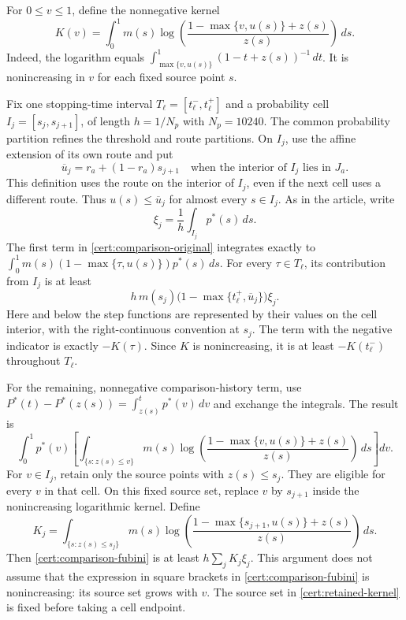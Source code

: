 \documentclass[11pt,a4paper]{article}
\begin{document}
For $0\leq v\leq1$, define the nonnegative kernel
\begin{equation}
 K(v)=\int_0^1m(s)
 \log\!\left(\frac{1-\max\{v,u(s)\}+z(s)}{z(s)}\right)\,ds.
 \label{cert:kernel}
\end{equation}
Indeed, the logarithm equals
$\int_{\max\{v,u(s)\}}^1(1-t+z(s))^{-1}\,dt$.
It is nonincreasing in $v$ for each fixed source point $s$.

Fix one stopping-time interval
$T_\ell=[t_\ell^-,t_\ell^+]$ and a probability cell
$I_j=[s_j,s_{j+1}]$, of length $h=1/N_p$ with $N_p=10240$.
The common probability partition refines the threshold and route
partitions.  On $I_j$, use the affine extension of its own route and put
\[
 \overline u_j=r_a+(1-r_a)s_{j+1}
 \quad\text{when the interior of $I_j$ lies in $J_a$}.
\]
This definition uses the route on the interior of $I_j$, even if the
next cell uses a different route.  Thus $u(s)\leq\overline u_j$ for
almost every $s\in I_j$.
As in the article, write
\[
 \xi_j=\frac1h\int_{I_j}p^*(s)\,ds.
\]
The first term in \eqref{cert:comparison-original} integrates exactly to
$\int_0^1m(s)(1-\max\{\tau,u(s)\})p^*(s)\,ds$.
For every $\tau\in T_\ell$, its contribution from $I_j$ is at least
\begin{equation}
 h\,m(s_j)\bigl(1-\max\{t_\ell^+,\overline u_j\}\bigr)\xi_j.
 \label{cert:comparison-direct}
\end{equation}
Here and below the step functions are represented by their values on
the cell interior, with the right-continuous convention at $s_j$.
The term with the negative indicator is exactly $-K(\tau)$.
Since $K$ is nonincreasing, it is at least $-K(t_\ell^-)$ throughout
$T_\ell$.

For the remaining, nonnegative comparison-history term, use
$P^*(t)-P^*(z(s))=\int_{z(s)}^t p^*(v)\,dv$ and exchange the integrals.
The result is
\begin{equation}
 \int_0^1p^*(v)
 \left[\int_{\{s:z(s)\leq v\}}m(s)
 \log\!\left(\frac{1-\max\{v,u(s)\}+z(s)}{z(s)}\right)\,ds\right]dv.
 \label{cert:comparison-fubini}
\end{equation}
For $v\in I_j$, retain only the source points with $z(s)\leq s_j$.
They are eligible for every $v$ in that cell.  On this fixed source set,
replace $v$ by $s_{j+1}$ inside the nonincreasing logarithmic kernel.
Define
\begin{equation}
 K_j=\int_{\{s:z(s)\leq s_j\}}m(s)
 \log\!\left(\frac{1-\max\{s_{j+1},u(s)\}+z(s)}{z(s)}\right)\,ds.
 \label{cert:retained-kernel}
\end{equation}
Then \eqref{cert:comparison-fubini} is at least
$h\sum_jK_j\xi_j$.  This argument does not assume that the expression
in square brackets in \eqref{cert:comparison-fubini} is nonincreasing:
its source set grows with $v$.  The source set in
\eqref{cert:retained-kernel} is fixed before taking a cell endpoint.
\end{document}
